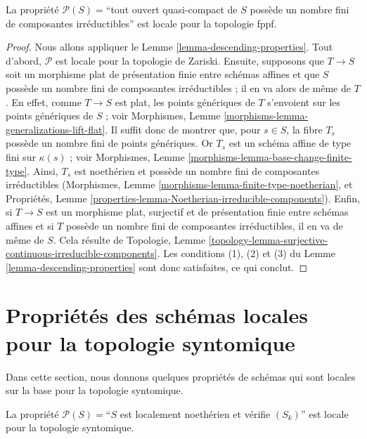 \begin{lemma}
\label{lemma-locally-finite-nr-irred-local-fppf}
La propriété $\mathcal{P}(S) =$``tout ouvert quasi-compact de $S$ possède
un nombre fini de composantes irréductibles'' est locale pour la topologie
fppf.
\end{lemma}

\begin{proof}
Nous allons appliquer le Lemme \ref{lemma-descending-properties}.
Tout d'abord, $\mathcal{P}$ est locale pour la topologie de Zariski.
Ensuite, supposons que $T \to S$ soit un morphisme plat de présentation
finie entre schémas affines et que $S$ possède un nombre fini de composantes
irréductibles ; il en va alors de même de $T$. En effet, comme $T \to S$ est
plat, les points génériques de $T$ s'envoient sur les points génériques de
$S$ ; voir Morphismes, Lemme
\ref{morphisms-lemma-generalizations-lift-flat}. Il suffit donc de montrer
que, pour $s \in S$, la fibre $T_s$ possède un nombre fini de points
génériques. Or $T_s$ est un schéma affine de type fini sur $\kappa(s)$ ;
voir Morphismes, Lemme \ref{morphisms-lemma-base-change-finite-type}.
Ainsi, $T_s$ est noethérien et possède un nombre fini de composantes
irréductibles (Morphismes, Lemme
\ref{morphisms-lemma-finite-type-noetherian}, et Propriétés, Lemme
\ref{properties-lemma-Noetherian-irreducible-components}). Enfin, si
$T \to S$ est un morphisme plat, surjectif et de présentation finie entre
schémas affines et si $T$ possède un nombre fini de composantes
irréductibles, il en va de même de $S$. Cela résulte de Topologie, Lemme
\ref{topology-lemma-surjective-continuous-irreducible-components}.
Les conditions (1), (2) et (3) du Lemme
\ref{lemma-descending-properties} sont donc satisfaites, ce qui conclut.
\end{proof}




\section{Propriétés des schémas locales pour la topologie syntomique}
\label{section-descending-properties-syntomic}

\noindent
Dans cette section, nous donnons quelques propriétés de schémas qui sont
locales sur la base pour la topologie syntomique.

\begin{lemma}
\label{lemma-Sk-local-syntomic}
La propriété $\mathcal{P}(S) =$``$S$ est localement noethérien et vérifie
$(S_k)$'' est locale pour la topologie syntomique.
\end{lemma}

